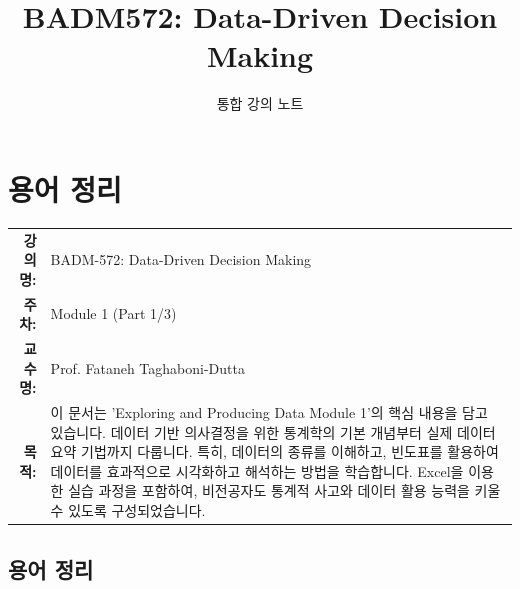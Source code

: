 \documentclass[11pt,a4paper]{book}
\title{\textbf{BADM572: Data-Driven Decision Making}}
\author{통합 강의 노트}
\date{}
\makeatletter
\theoremstyle{definition}
\newcommand{\metainfo}[4]{
\begin{tcolorbox}[
    colback=lightpurple,
    colframe=darkpurple,
    boxrule=1pt,
    arc=2mm,
    left=10pt,
    right=10pt,
    top=8pt,
    bottom=8pt
]
\begin{tabular}{@{}rl@{}}
\textbf{강의명:} & #1 \\[0.3em]
\textbf{주차:} & #2 \\[0.3em]
\textbf{교수명:} & #3 \\[0.3em]
\textbf{목적:} & \begin{minipage}[t]{0.75\textwidth}#4\end{minipage}
\end{tabular}
\end{tcolorbox}
}
\makeatother
\begin{document}
\maketitle
\tableofcontents


\chapter{용어 정리}
\label{ch:module1}

\metainfo{BADM-572: Data-Driven Decision Making}{Module 1 (Part 1/3)}{Prof. Fataneh Taghaboni-Dutta}{이 문서는 'Exploring and Producing Data Module 1'의 핵심 내용을 담고 있습니다. 데이터 기반 의사결정을 위한 통계학의 기본 개념부터 실제 데이터 요약 기법까지 다룹니다. 특히, 데이터의 종류를 이해하고, 빈도표를 활용하여 데이터를 효과적으로 시각화하고 해석하는 방법을 학습합니다. Excel을 이용한 실습 과정을 포함하여, 비전공자도 통계적 사고와 데이터 활용 능력을 키울 수 있도록 구성되었습니다.}


\section{용어 정리}
\end{document}
